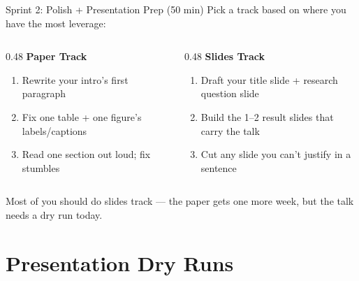 \begin{frame}{Sprint 2: Polish + Presentation Prep (50 min)}
  Pick a track based on where you have the most leverage:

  \vspace{8pt}

  \begin{columns}[T]
    \begin{column}{0.48\textwidth}
      \textbf{\textcolor{usfgreen}{Paper Track}}
      \begin{enumerate}\setlength\itemsep{1pt}
        \item Rewrite your intro's first paragraph
        \item Fix one table + one figure's labels/captions
        \item Read one section out loud; fix stumbles
      \end{enumerate}
    \end{column}
    \begin{column}{0.48\textwidth}
      \textbf{\textcolor{usfgreen}{Slides Track}}
      \begin{enumerate}\setlength\itemsep{1pt}
        \item Draft your title slide + research question slide
        \item Build the 1--2 result slides that carry the talk
        \item Cut any slide you can't justify in a sentence
      \end{enumerate}
    \end{column}
  \end{columns}

  \vspace{10pt}

  Most of you should do slides track --- the paper gets one more week, but the talk needs a dry run today.
\end{frame}

\section{Presentation Dry Runs}

